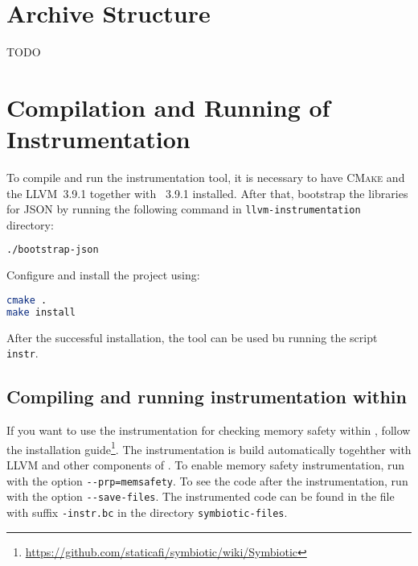 
\section{Archive Structure}

TODO

\section{Compilation and Running of Instrumentation}

To compile and run the instrumentation tool, it is necessary to have
\textsc{CMake} and the LLVM~3.9.1 together with \clang~3.9.1 installed. After
that, bootstrap the libraries for JSON by running the following command in
\texttt{llvm-instrumentation} directory:

\begin{lstlisting}[language=bash]
./bootstrap-json
\end{lstlisting}

\noindent Configure and install the project using:

\begin{lstlisting}[language=bash]
cmake .
make install
\end{lstlisting}

\noindent After the successful installation, the tool can be used bu running the script
\texttt{instr}.


\subsection{Compiling and running instrumentation within \symbiotic}

If you want to use the instrumentation for checking memory safety within
\symbiotic, follow the \symbiotic installation
guide\footnote{\url{https://github.com/staticafi/symbiotic/wiki/Symbiotic}}.
The instrumentation is build automatically togehther with LLVM and other
components of \symbiotic. To enable memory safety instrumentation, run
\symbiotic with the option \texttt{-{}-prp=memsafety}. To see the code after
the instrumentation, run \symbiotic with the option \texttt{-{}-save-files}.
The instrumented code can be found in the file with suffix \texttt{-instr.bc}
in the directory \texttt{symbiotic-files}.

